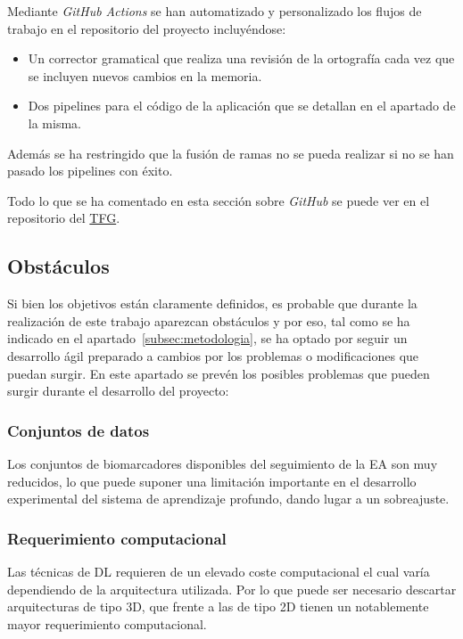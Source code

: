 Mediante \textit{GitHub Actions} se han automatizado y personalizado los flujos de trabajo en el repositorio del proyecto
incluyéndose:
\begin{itemize}
    \item Un corrector gramatical que realiza una revisión de la ortografía cada vez que se incluyen nuevos cambios en
    la memoria.
    \item Dos pipelines para el código de la aplicación que se detallan en el apartado de la misma.\\
\end{itemize}

Además se ha restringido que la fusión de ramas no se pueda realizar si no se han pasado los pipelines con éxito.

Todo lo que se ha comentado en esta sección sobre \textit{GitHub} se puede ver en el repositorio del
\href{https://github.com/raquelmolinare/TFG}{TFG}.

\subsection{Obstáculos}\label{subsec:obstaculos}
Si bien los objetivos están claramente definidos, es probable que durante la realización de este trabajo aparezcan 
obstáculos y por eso, tal como se ha indicado en el apartado~\ref{subsec:metodologia}, se ha optado por seguir un
desarrollo ágil preparado a cambios por los problemas o modificaciones que puedan surgir.
En este apartado se prevén los posibles problemas que pueden surgir durante el desarrollo del proyecto:

\subsubsection{Conjuntos de datos}
Los conjuntos de biomarcadores disponibles del seguimiento de la EA son muy reducidos, lo que puede suponer una
limitación importante en el desarrollo experimental del sistema de aprendizaje profundo, dando lugar a un sobreajuste.

\subsubsection{Requerimiento computacional}
Las técnicas de DL requieren de un elevado coste computacional el cual varía dependiendo de la arquitectura utilizada.
Por lo que puede ser necesario descartar arquitecturas de tipo 3D, que frente a las de tipo 2D tienen un notablemente
mayor requerimiento computacional.

